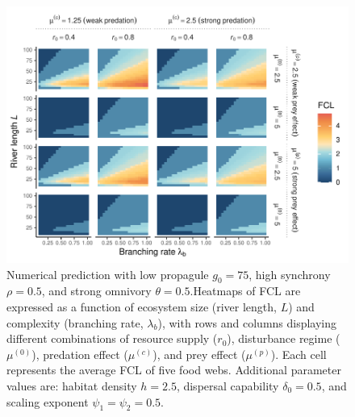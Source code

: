 \begin{figure}
\centering
\includegraphics{../data_fmt/fig_rho05_g75_theta05.pdf}
\caption{Numerical prediction with low propagule \(g_0 = 75\), high
synchrony \(\rho = 0.5\), and strong omnivory \(\theta = 0.5\).Heatmaps
of FCL are expressed as a function of ecosystem size (river length,
\(L\)) and complexity (branching rate, \(\lambda_b\)), with rows and
columns displaying different combinations of resource supply (\(r_0\)),
disturbance regime (\(\mu^{(0)}\)), predation effect (\(\mu^{(c)}\)),
and prey effect (\(\mu^{(p)}\)). Each cell represents the average FCL of
five food webs. Additional parameter values are: habitat density
\(h=2.5\), dispersal capability \(\delta_0=0.5\), and scaling exponent
\(\psi_1=\psi_2=0.5\).}
\end{figure}

\newpage

